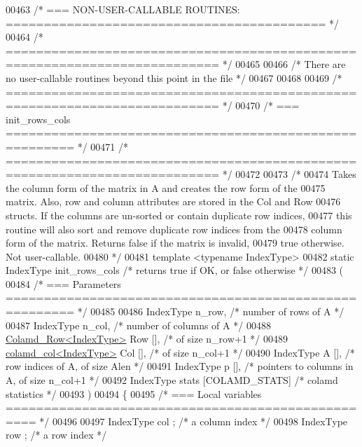 \begin{DoxyCode}
{{{{{{{00463 \textcolor{comment}{/* === NON-USER-CALLABLE ROUTINES: ========================================== */}
00464 \textcolor{comment}{/* ========================================================================== */}
00465 
00466 \textcolor{comment}{/* There are no user-callable routines beyond this point in the file */}
00467 
00468 
00469 \textcolor{comment}{/* ========================================================================== */}
00470 \textcolor{comment}{/* === init\_rows\_cols ======================================================= */}
00471 \textcolor{comment}{/* ========================================================================== */}
00472 
00473 \textcolor{comment}{/*}
00474 \textcolor{comment}{  Takes the column form of the matrix in A and creates the row form of the}
00475 \textcolor{comment}{  matrix.  Also, row and column attributes are stored in the Col and Row}
00476 \textcolor{comment}{  structs.  If the columns are un-sorted or contain duplicate row indices,}
00477 \textcolor{comment}{  this routine will also sort and remove duplicate row indices from the}
00478 \textcolor{comment}{  column form of the matrix.  Returns false if the matrix is invalid,}
00479 \textcolor{comment}{  true otherwise.  Not user-callable.}
00480 \textcolor{comment}{*/}
00481 \textcolor{keyword}{template} <\textcolor{keyword}{typename} IndexType>
00482 \textcolor{keyword}{static} IndexType init\_rows\_cols  \textcolor{comment}{/* returns true if OK, or false otherwise */}
00483   (
00484     \textcolor{comment}{/* === Parameters ======================================================= */}
00485 
00486     IndexType n\_row,      \textcolor{comment}{/* number of rows of A */}
00487     IndexType n\_col,      \textcolor{comment}{/* number of columns of A */}
00488     \hyperlink{structinternal_1_1_colamd___row}{Colamd\_Row<IndexType>} Row [],    \textcolor{comment}{/* of size n\_row+1 */}
00489     \hyperlink{structinternal_1_1colamd__col}{colamd\_col<IndexType>} Col [],    \textcolor{comment}{/* of size n\_col+1 */}
00490     IndexType A [],     \textcolor{comment}{/* row indices of A, of size Alen */}
00491     IndexType p [],     \textcolor{comment}{/* pointers to columns in A, of size n\_col+1 */}
00492     IndexType stats [COLAMD\_STATS]  \textcolor{comment}{/* colamd statistics */} 
00493     )
00494 \{
00495   \textcolor{comment}{/* === Local variables ================================================== */}
00496 
00497   IndexType col ;     \textcolor{comment}{/* a column index */}
00498   IndexType row ;     \textcolor{comment}{/* a row index */}
}}}}}}}
\end{DoxyCode}
